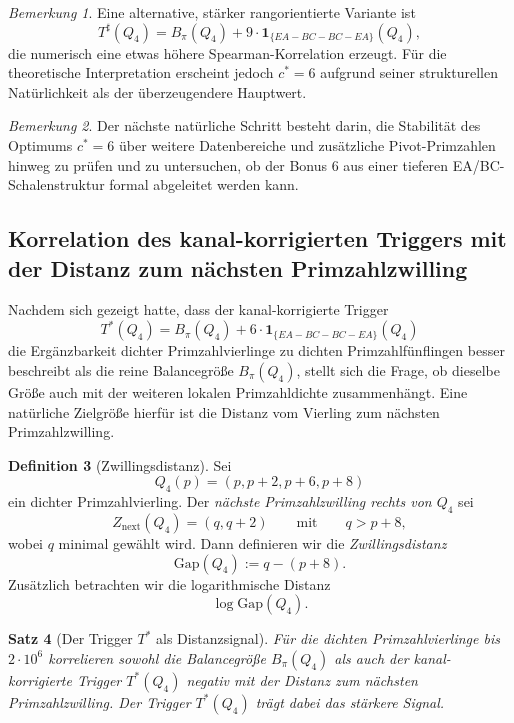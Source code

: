 \documentclass[11pt,a4paper]{article}
\newtheorem{satz}{Satz}
\theoremstyle{definition}
\newtheorem{definition}[satz]{Definition}
\theoremstyle{remark}
\newtheorem{bemerkung}[satz]{Bemerkung}
\begin{document}
	\begin{bemerkung}
		Eine alternative, stärker rangorientierte Variante ist
		\[
		T^\sharp(Q_4)=B_\pi(Q_4)+9\cdot \mathbf 1_{\{EA-BC-BC-EA\}}(Q_4),
		\]
		die numerisch eine etwas höhere Spearman-Korrelation erzeugt. Für die theoretische
		Interpretation erscheint jedoch \(c^*=6\) aufgrund seiner strukturellen Natürlichkeit als
		der überzeugendere Hauptwert.
	\end{bemerkung}
	
	\begin{bemerkung}
		Der nächste natürliche Schritt besteht darin, die Stabilität des Optimums \(c^*=6\) über
		weitere Datenbereiche und zusätzliche Pivot-Primzahlen hinweg zu prüfen und zu
		untersuchen, ob der Bonus \(6\) aus einer tieferen EA/BC-Schalenstruktur formal
		abgeleitet werden kann.
	\end{bemerkung}
	
	\subsection{Korrelation des kanal-korrigierten Triggers mit der Distanz zum nächsten Primzahlzwilling}
	
	Nachdem sich gezeigt hatte, dass der kanal-korrigierte Trigger
	\[
	T^*(Q_4)=B_\pi(Q_4)+6\cdot \mathbf 1_{\{EA-BC-BC-EA\}}(Q_4)
	\]
	die Ergänzbarkeit dichter Primzahlvierlinge zu dichten Primzahlfünflingen besser beschreibt
	als die reine Balancegröße \(B_\pi(Q_4)\), stellt sich die Frage, ob dieselbe Größe auch mit
	der weiteren lokalen Primzahldichte zusammenhängt. Eine natürliche Zielgröße hierfür ist die
	Distanz vom Vierling zum nächsten Primzahlzwilling.
	
	\begin{definition}[Zwillingsdistanz]
		\label{def:zwillingsdistanz}
		Sei
		\[
		Q_4(p)=(p,p+2,p+6,p+8)
		\]
		ein dichter Primzahlvierling. Der \emph{nächste Primzahlzwilling rechts von \(Q_4\)} sei
		\[
		Z_{\mathrm{next}}(Q_4)=(q,q+2)
		\qquad\text{mit}\qquad q>p+8,
		\]
		wobei \(q\) minimal gewählt wird. Dann definieren wir die \emph{Zwillingsdistanz}
		\[
		\mathrm{Gap}(Q_4):=q-(p+8).
		\]
		Zusätzlich betrachten wir die logarithmische Distanz
		\[
		\log \mathrm{Gap}(Q_4).
		\]
	\end{definition}
	
	\begin{satz}[Der Trigger \(T^*\) als Distanzsignal]
		\label{satz:trigger_zwillingsdistanz}
		Für die dichten Primzahlvierlinge bis \(2\cdot 10^6\) korrelieren sowohl die Balancegröße
		\(B_\pi(Q_4)\) als auch der kanal-korrigierte Trigger \(T^*(Q_4)\) negativ mit der Distanz
		zum nächsten Primzahlzwilling. Der Trigger \(T^*(Q_4)\) trägt dabei das stärkere Signal.
	\end{satz}
	
\end{document}
